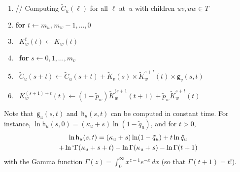 \documentclass{elsarticle}
\newenvironment{fmpage}[1]
        {\begin{lrbox}{\tmpbox}\begin{minipage}{#1}}
        {\end{minipage}\end{lrbox}\fbox{\usebox{\tmpbox}}}
\newcommand{\nlik}{C}
\newcommand{\slik}{K}
\newcommand{\nx}{u}
\newcommand{\ny}{v}
\newcommand{\nz}{w}
\begin{document}
\begin{center}\small
\begin{fmpage}{0.8\textwidth} 
\begin{enumerate}[label=\arabic*,nosep]
\item[] // Computing $\tilde{\nlik}_{\nx}(\ell)$ for all $\ell$ at~$\nx$ with children $\nx\ny,\nx\nz\in T$
\item \textbf{for} $t\gets m_{\nz}, m_{\nz}-1, \dotsc, 0$ 
\item\quad\ $\slik_{\nz}^t(t) \gets \slik_{\nz}(t)$
\item\quad\ \textbf{for} $s\gets 0,1,\dotsc, m_{\ny}$
\item\qquad\ $\tilde{\nlik}_{\nx}(s+t)\gets \tilde{\nlik}_{\nx}(s+t)+\tilde{\slik}_{\ny}(s)\times \tilde{\slik}_{\nz}^{s+t}(t) 
	\times \mathsf{g}_{\ny}(s,t)$ 
\item\qquad\	$\slik_{\nz}^{(s+1)+t}(t) \gets (1-\tilde{p}_{\nz}) \tilde{\slik}_{\nz}^{(s+1}(t+1)+\tilde{p}_{\nz} \tilde{\slik}_{\nz}^{s+t}(t)$
\end{enumerate}
\end{fmpage}
\end{center}
Note that~$\mathsf{g}_{\nx}(s,t)$ and~$\mathsf{h}_{\nx}(s,t)$ can be computed in constant time.
For instance,  
$\ln \mathsf{h}_{\nx}(s,0) = (\kappa_{\nx}+s)\ln(1-\tilde{q}_{\nx})$, and 
for $t>0$, 
\begin{multline*}
\ln \mathsf{h}_{\nx}(s,t)
	=  (\kappa_{\nx}+s)\ln(1-\tilde{q}_{\nx}) + t \ln\tilde{q}_{\nx}
	\\
	+ \ln` \Gamma(\kappa_{\nx}+s+t)-\ln\Gamma(\kappa_{\nx}+s)-\ln\Gamma(t+1)
\end{multline*}
with the Gamma function $\Gamma(z)=\int_0^{\infty} x^{z-1}e^{-x}\,dx$ (so that $\Gamma(t+1)=t!$).  
\end{document}
